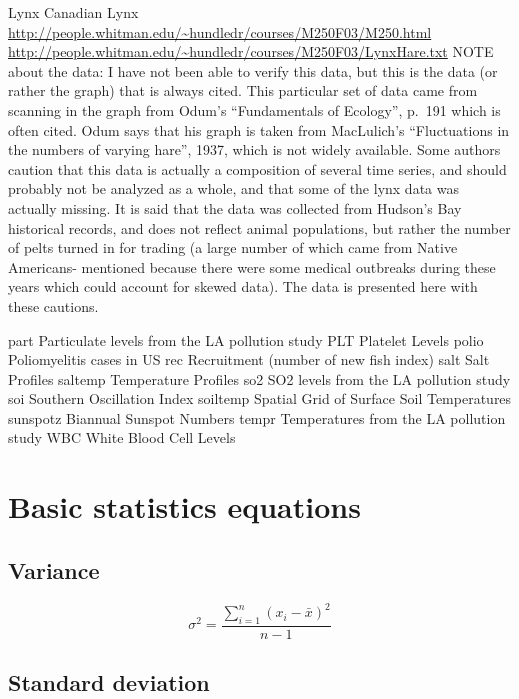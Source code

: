 \documentclass[
]{book}
\begin{document}
Lynx Canadian Lynx
\url{http://people.whitman.edu/~hundledr/courses/M250F03/M250.html}
\url{http://people.whitman.edu/~hundledr/courses/M250F03/LynxHare.txt}
NOTE about the data: I have not been able to verify this data, but this is the data (or rather the graph) that is always cited. This particular set of data came from scanning in the graph from Odum's ``Fundamentals of Ecology'', p.~191 which is often cited. Odum says that his graph is taken from MacLulich's ``Fluctuations in the numbers of varying hare'', 1937, which is not widely available. Some authors caution that this data is actually a composition of several time series, and should probably not be analyzed as a whole, and that some of the lynx data was actually missing. It is said that the data was collected from Hudson's Bay historical records, and does not reflect animal populations, but rather the number of pelts turned in for trading (a large number of which came from Native Americans- mentioned because there were some medical outbreaks during these years which could account for skewed data). The data is presented here with these cautions.

part Particulate levels from the LA pollution study
PLT Platelet Levels
polio Poliomyelitis cases in US
rec Recruitment (number of new fish index)
salt Salt Profiles
saltemp Temperature Profiles
so2 SO2 levels from the LA pollution study
soi Southern Oscillation Index
soiltemp Spatial Grid of Surface Soil Temperatures
sunspotz Biannual Sunspot Numbers
tempr Temperatures from the LA pollution study
WBC White Blood Cell Levels

\hypertarget{basic-statistics-equations}{%
\chapter{Basic statistics equations}\label{basic-statistics-equations}}

\hypertarget{variance}{%
\section{Variance}\label{variance}}

\[\sigma^2 = {\frac{\sum\limits_{i=1}^{n} \left(x_{i} - \bar{x}\right)^{2}} {n-1}}\]

\hypertarget{standard-deviation}{%
\section{Standard deviation}\label{standard-deviation}}
\end{document}
